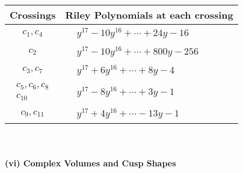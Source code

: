 \documentclass[1p]{elsarticle_modified}
\theoremstyle{definition}
\begin{document}
\begin{tabular}{m{50pt}|m{274pt}}
Crossings & \hspace{64pt}Riley Polynomials at each crossing \\
\hline $$\begin{aligned}c_{1},c_{4}\end{aligned}$$&$\begin{aligned}
&y^{17}-10 y^{16}+\cdots+24 y-16
\end{aligned}$\\
\hline $$\begin{aligned}c_{2}\end{aligned}$$&$\begin{aligned}
&y^{17}-10 y^{16}+\cdots+800 y-256
\end{aligned}$\\
\hline $$\begin{aligned}c_{3},c_{7}\end{aligned}$$&$\begin{aligned}
&y^{17}+6 y^{16}+\cdots+8 y-4
\end{aligned}$\\
\hline $$\begin{aligned}c_{5},c_{6},c_{8}\\c_{10}\end{aligned}$$&$\begin{aligned}
&y^{17}-8 y^{16}+\cdots+3 y-1
\end{aligned}$\\
\hline $$\begin{aligned}c_{9},c_{11}\end{aligned}$$&$\begin{aligned}
&y^{17}+4 y^{16}+\cdots-13 y-1
\end{aligned}$\\
\hline
\end{tabular}\\~\\
\newpage\flushleft \textbf{(vi) Complex Volumes and Cusp Shapes}
\end{document}
